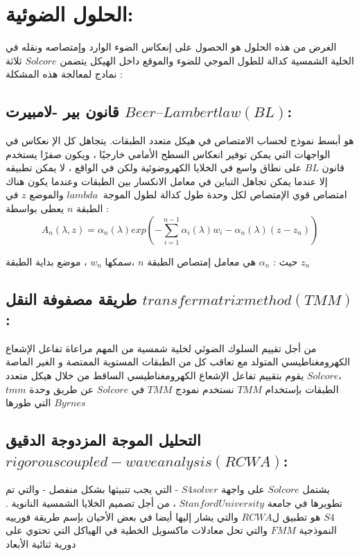 \section{الحلول الضوئية:}
الغرض من هذه الحلول هو الحصول على إنعكاس الضوء الوارد وإمتصاصه ونقله في الخلية الشمسية كدالة للطول الموجي للضوء والموقع داخل الهيكل 
يتضمن $ Solcore $ ثلاثة نمادج لمعالجة هذه المشكلة :
\subsection{قانون بير -لامبيرت $ Beer–Lambert law (BL) $:}
هو أبسط نموذج لحساب الامتصاص في هيكل متعدد الطبقات. يتجاهل كل الإ نعكاس في الواجهات التي يمكن توفير انعكاس السطح الأمامي خارجيًا ، ويكون صفرًا 
يستخدم قانون $ BL $ على نطاق واسع في الخلايا الكهروضوئية ولكن في الواقع ، لا يمكن تطبيقه إلا عندما يمكن تجاهل التباين في معامل الانكسار بين الطبقات وعندما يكون هناك امتصاص قوي
الإمتصاص لكل وحدة طول كدالة لطول الموجة $ lambda\  $ والموضع $ z $ في الطبقة $ n $ يعطى بواسطة : 
\begin{equation}
	A_n(\lambda,z)=\alpha_n(\lambda)exp(-\sum_{i=1}^{ n-1}\alpha_i(\lambda)w_i-\alpha_ n ( \lambda )(z-z_n))
\end{equation}

حيث : $\alpha_n$ هي معامل إمتصاص الطبقة $ n $  ،سمكها  $ w_n $ ، موضع بداية الطبقة $  z_n $


\subsection{ طريقة مصفوفة النقل $ transfer matrix method (TMM) $ :}
من أجل تقييم  السلوك الضوئي لخلية شمسية من المهم مراعاة تفاعل الإشعاع الكهرومغناطيسي المتولد مع تعاقب كل من الطبقات المستوية  الممتصة و الغير الماصة ،$ Solcore $  يقوم بتقييم تفاعل الإشعاع الكهرومغناطيسي الساقط من خلال هيكل متعدد الطبقات بإستخدام $ TMM $ 
نستخدم نمودج $ TMM $  في $ Solcore $ عن طريق وحدة $ tmm $ التي طورها $ Byrnes $   

\subsection{التحليل الموجة المزدوجة الدقيق$  rigorous coupled-wave analysis (RCWA) $:}
يشتمل $ Solcore $ على واجهة $ S4 solver $ - التي يجب تتبيثها بشكل منفصل - والتي تم تطويرها في جامعة $ Stanford University $ ، من أجل تصميم الخلايا الشمسية النانوية . $ S4 $ هو تطبيق ل$ RCWA $ والتي يشار إليها أيضا في بعض الأحيان بإسم طريقة فورييه النموذجية $ FMM $  والتي تحل معادلات ماكسويل الخطية  في الهياكل التي تحتوي على دورية ثنائية الأبعاد 

